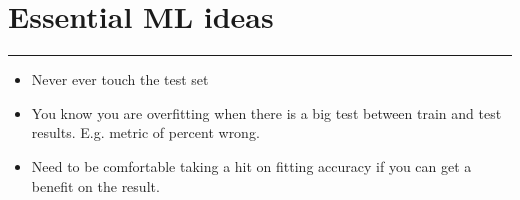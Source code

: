\section{Essential ML ideas}
\smallskip \hrule height 2pt \smallskip

\begin{itemize}
	\item Never ever touch the test set
	\item You know you are overfitting when there is a big test between train and test results.  E.g. metric of percent wrong. 
	\item Need to be comfortable taking a hit on fitting accuracy if you can get a benefit on the result.
\end{itemize}